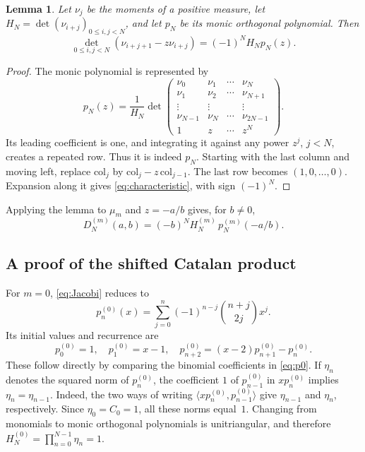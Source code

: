 \documentclass[11pt,a4paper]{article}
\numberwithin{equation}{section}
\newtheorem{lemma}[theorem]{Lemma}
\theoremstyle{definition}
\theoremstyle{remark}
\newcommand{\D}[2]{D_{#1}^{(#2)}}
\newcommand{\HH}[2]{H_{#1}^{(#2)}}
\begin{document}
\begin{lemma}\label{lem:characteristic}
Let $\nu_j$ be the moments of a positive measure, let
$H_N=\det(\nu_{i+j})_{0\leq i,j<N}$, and let $p_N$ be its monic orthogonal
polynomial.  Then
\begin{equation}\label{eq:characteristic}
 \det_{0\leq i,j<N}(\nu_{i+j+1}-z\nu_{i+j})
   =(-1)^N H_Np_N(z).
\end{equation}
\end{lemma}
\begin{proof}
The monic polynomial is represented by
\[
 p_N(z)=\frac1{H_N}
 \det\begin{pmatrix}
 \nu_0&\nu_1&\cdots&\nu_N\\
 \nu_1&\nu_2&\cdots&\nu_{N+1}\\
 \vdots&\vdots&&\vdots\\
 \nu_{N-1}&\nu_N&\cdots&\nu_{2N-1}\\
 1&z&\cdots&z^N
 \end{pmatrix}.
\]
Its leading coefficient is one, and integrating it against any power
$z^j$, $j<N$, creates a repeated row.  Thus it is indeed $p_N$.
Starting with the last column and moving left, replace
$\mathrm{col}_j$ by $\mathrm{col}_j-z\,\mathrm{col}_{j-1}$.
The last row becomes $(1,0,\ldots,0)$.  Expansion along it gives
\eqref{eq:characteristic}, with sign $(-1)^N$.
\end{proof}

Applying the lemma to $\mu_m$ and $z=-a/b$ gives, for $b\ne0$,
\begin{equation}\label{eq:characteristicD}
 \D{N}{m}(a,b)=(-b)^N\HH{N}{m}\,p_N^{(m)}(-a/b).
\end{equation}

\subsection{A proof of the shifted Catalan product}
For $m=0$, \eqref{eq:Jacobi} reduces to
\begin{equation}\label{eq:p0}
 p_n^{(0)}(x)=\sum_{j=0}^n(-1)^{n-j}\binom{n+j}{2j}x^j.
\end{equation}
Its initial values and recurrence are
\begin{equation}\label{eq:p0rec}
 p_0^{(0)}=1,\quad p_1^{(0)}=x-1,\quad
 p_{n+2}^{(0)}=(x-2)p_{n+1}^{(0)}-p_n^{(0)}.
\end{equation}
These follow directly by comparing the binomial coefficients in
\eqref{eq:p0}.  If $\eta_n$ denotes the squared norm of $p_n^{(0)}$, the
coefficient $1$ of $p_{n-1}^{(0)}$ in $xp_n^{(0)}$ implies
$\eta_n=\eta_{n-1}$.  Indeed, the two ways of writing
$\langle xp_n^{(0)},p_{n-1}^{(0)}\rangle$
give $\eta_{n-1}$ and $\eta_n$, respectively.  Since
$\eta_0=C_0=1$, all these norms equal~$1$.  Changing from monomials to
monic orthogonal polynomials is unitriangular, and therefore
$H_N^{(0)}=\prod_{n=0}^{N-1}\eta_n=1$.
\end{document}
